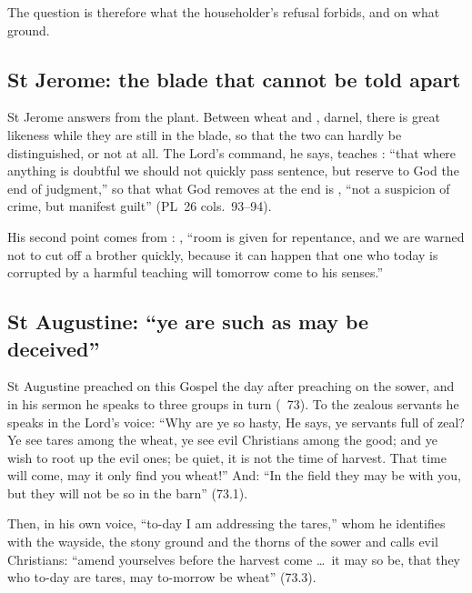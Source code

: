 The question is therefore what the householder's refusal forbids, and on
what ground.

\subsection{St Jerome: the blade that cannot be told apart}
\label{sec:patience-jerome}

St Jerome answers from the plant. Between wheat and , darnel,
there is great likeness while they are still in the blade, so that the two
can hardly be distinguished, or not at all. The Lord's
command, he says, teaches : ``that where anything is
doubtful we should not quickly pass sentence, but reserve to God the end of
judgment,'' so that what God removes at the end is , ``not a suspicion of crime, but manifest
guilt'' (PL~26 cols.~93--94).

His second point comes from : , ``room is
given for repentance, and we are warned not to cut off a brother quickly,
because it can happen that one who today is corrupted by a harmful teaching
will tomorrow come to his senses.''

\subsection{St Augustine: ``ye are such as may be deceived''}
\label{sec:patience-augustine}

St Augustine preached on this Gospel the day after preaching on the sower,
and in his sermon he speaks to three groups in turn (~73). To the
zealous servants he speaks in the Lord's voice: ``Why are ye so hasty, He
says, ye servants full of zeal? Ye see tares among the wheat, ye see evil Christians among the good; and
ye wish to root up the evil ones; be quiet, it is not the time of harvest.
That time will come, may it only find you wheat!'' And: ``In the field they
may be with you, but they will not be so in the barn'' (73.1).

Then, in his own voice, ``to-day I am addressing the tares,'' whom he
identifies with the wayside, the stony ground and the thorns of the sower and
calls evil Christians: ``amend yourselves before the harvest come \dots\ it may so be, that they who to-day are tares, may to-morrow
be wheat'' (73.3).

